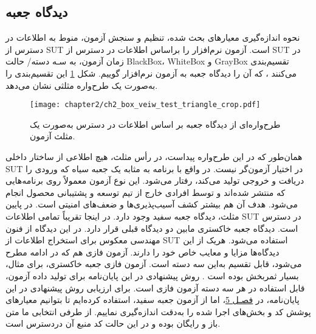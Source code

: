   
  
  \subsection{دیدگاه جعبه}\label{box_view}
  نحوه اندازه‌گیری معیارهای بحث شده، تنظیم و سنجش آزمون، منوط به اطلاعات در دسترس از \gls{SUT} است. آزمون نرم‌افزار را براساس اطلاعات در دسترس از \gls{SUT} در زمان آزمون، به سـه دسته/ حالت \gls{BlackBox}، \gls{WhiteBox} و \gls{GrayBox} تقسیم‌بندی می‌کنند \cite{ammann2016introduction,Mcnally2012}، که آن ‌را دیدگاه جعبه به آزمون نرم‌افزار گوییم. شکل \ref{ch2_box_veiw_test_triangle_crop.pdf} این تقسیم‌بندی را به‌صورت یک طرح‌واره مثلثی نشان می‌دهد.
  \begin{figure}%
  	\centering
  	\texttt{[image: chapter2/ch2\_box\_veiw\_test\_triangle\_crop.pdf]}
  	\caption[دیدگاه جعبه در آزمون نرم‌افزار]
  	{
  		طرح‌واره‌ای از دیدگاه جعبه بر اساس اطلاعات در دسترس به‌صورت یک مثلث آزمون\cite{ZakeriSeminar2017}.
  	}
  	\label{ch2_box_veiw_test_triangle_crop.pdf}
  \end{figure}
  
  
  همان‌طور که در این طرح‌واره پیداست، در رأس مثلث، هیچ اطلاعی از ساختار داخلی \gls{SUT} در اختیار آزمون‌گر نیست. در واقع با برنامه به مثابه یک جعبه سیاه که ورودی را دریافت و خروجی تولید می‌کند، رفتار می‌شود. این نوع آزمون معمولاً روی برنامه‌هایی که منتشر شده‌اند و توسط افرادی خارج از تیم توسعه و پشتیبانی محصول انجام می‌شود. هدف آن هم بیشتر کشف آسیب‌پذیری‌‌ها و ضعف‌های امنیتی است. در پایین مثلث، دیدگاه جعبه سفید وجود دارد. در اینجا تقریباً تمامی اطلاعات \gls{SUT} در دسترس است. دیدگاه جعبه خاکستری مابین دو دیدگاه قبلی قرار دارد. در این دیدگاه از فنون مهندسی معکوس برای استخراج اطلاعات از \gls{SUT} استفاده می‌شود. هریک از این دیدگاه‌ها مزایا و معایب خاص خود را دارند\cite{Khan2012}. آزمون فازی هم که در ادامه مطرح می‌شود، قابل تقسیم به‌این سه دسته است. آزمون فازی جعبه خاکستری، برای مثال، بسیار ثمربخش بوده است   \cite{DBLP:journals/corr/abs-1711-04596, Zalewsky2013}. روش پیشنهادی در این پایان‌نامه برای تولید داده آزمون، قابل استفاده در هر سه دسته آزمون فازی است. برای ارزیابی روش پیشنهادی در این پایان‌نامه، در \hyperref[ch:5]{فصـل 5}، اما از آزمون جعبه سفید، استفاده کرده‌ایم تا بتوانیم معیارهای پوشش کد و بخش‌های اجرا شده را به‌دقت اندازه‌گیری نماییم. از طرفی  انتخابی ما متن باز و رایگان بوده و در این حالت کد منبع آن دردسترس است. 
 

